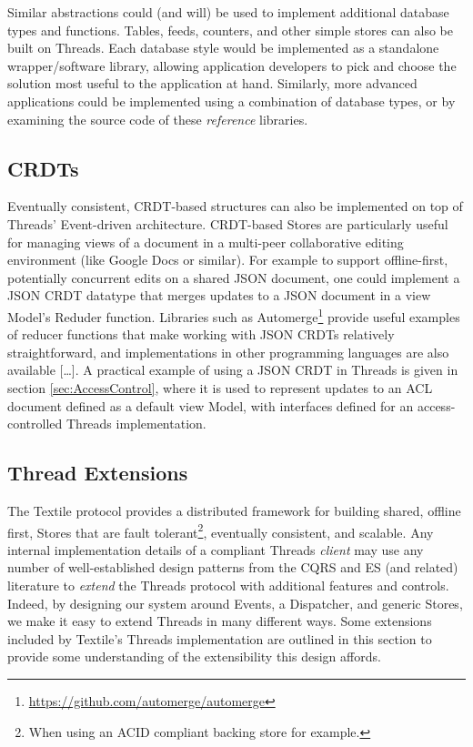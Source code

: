 \documentclass{textile}
\begin{document}
Similar abstractions could (and will) be used to implement additional database types and functions. Tables, feeds, counters, and other simple stores can also be built on Threads. Each database style would be implemented as a standalone wrapper/software library, allowing application developers to pick and choose the solution most useful to the application at hand. Similarly, more advanced applications could be implemented using a combination of database types, or by examining the source code of these \emph{reference} libraries.

\subsection{CRDTs} \label{sec:TexCRDT}

Eventually consistent, CRDT-based structures can also be implemented on top of Threads' Event-driven architecture. CRDT-based Stores are particularly useful for managing views of a document in a multi-peer collaborative editing environment (like Google Docs or similar). For example to support offline-first, potentially concurrent edits on a shared JSON document, one could implement a JSON CRDT datatype \cite{kleppmannConflictFreeReplicatedJSON2017} that merges updates to a JSON document in a view Model's Reduder function. Libraries such as Automerge\footnote{\url{https://github.com/automerge/automerge}} provide useful examples of reducer functions that make working with JSON CRDTs relatively straightforward, and implementations in other programming languages are also available [\dots]. A practical example of using a JSON CRDT in Threads is given in section \ref{sec:AccessControl}, where it is used to represent updates to an ACL document defined as a default view Model, with interfaces defined for an access-controlled Threads implementation.

\subsection{Thread Extensions}

The Textile protocol provides a distributed framework for building shared, offline first, Stores that are fault tolerant\footnote{When using an ACID compliant backing store for example.}, eventually consistent, and scalable. Any internal implementation details of a compliant Threads \emph{client} may use any number of well-established design patterns from the CQRS and ES (and related) literature to \emph{extend} the Threads protocol with additional features and controls. Indeed, by designing our system around Events, a Dispatcher, and generic Stores, we make it easy to extend Threads in many different ways. Some extensions included by Textile's Threads implementation are outlined in this section to provide some understanding of the extensibility this design affords.
\end{document}

